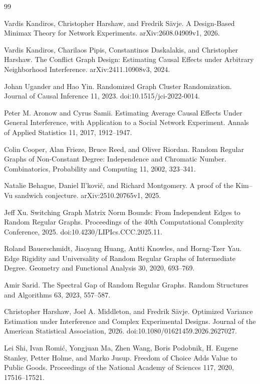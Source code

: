 \documentclass{article}
\begin{document}
\begin{thebibliography}{99}

   Vardis Kandiros, Christopher Harshaw, and Fredrik Sävje. A Design-Based Minimax Theory for Network Experiments. arXiv:2608.04909v1, 2026.

   Vardis Kandiros, Charilaos Pipis, Constantinos Daskalakis, and Christopher Harshaw. The Conflict Graph Design: Estimating Causal Effects under Arbitrary Neighborhood Interference. arXiv:2411.10908v3, 2024.

   Johan Ugander and Hao Yin. Randomized Graph Cluster Randomization. Journal of Causal Inference 11, 2023. doi:10.1515/jci-2022-0014.

   Peter M. Aronow and Cyrus Samii. Estimating Average Causal Effects Under General Interference, with Application to a Social Network Experiment. Annals of Applied Statistics 11, 2017, 1912--1947.

   Colin Cooper, Alan Frieze, Bruce Reed, and Oliver Riordan. Random Regular Graphs of Non-Constant Degree: Independence and Chromatic Number. Combinatorics, Probability and Computing 11, 2002, 323--341.

   Natalie Behague, Daniel Il'kovič, and Richard Montgomery. A proof of the Kim--Vu sandwich conjecture. arXiv:2510.20765v1, 2025.

   Jeff Xu. Switching Graph Matrix Norm Bounds: From Independent Edges to Random Regular Graphs. Proceedings of the 40th Computational Complexity Conference, 2025. doi:10.4230/LIPIcs.CCC.2025.11.

   Roland Bauerschmidt, Jiaoyang Huang, Antti Knowles, and Horng-Tzer Yau. Edge Rigidity and Universality of Random Regular Graphs of Intermediate Degree. Geometry and Functional Analysis 30, 2020, 693--769.

   Amir Sarid. The Spectral Gap of Random Regular Graphs. Random Structures and Algorithms 63, 2023, 557--587.

   Christopher Harshaw, Joel A. Middleton, and Fredrik Sävje. Optimized Variance Estimation under Interference and Complex Experimental Designs. Journal of the American Statistical Association, 2026. doi:10.1080/01621459.2026.2627027.

   Lei Shi, Ivan Romić, Yongjuan Ma, Zhen Wang, Boris Podobnik, H. Eugene Stanley, Petter Holme, and Marko Jusup. Freedom of Choice Adds Value to Public Goods. Proceedings of the National Academy of Sciences 117, 2020, 17516--17521.

\end{thebibliography}
\end{document}
